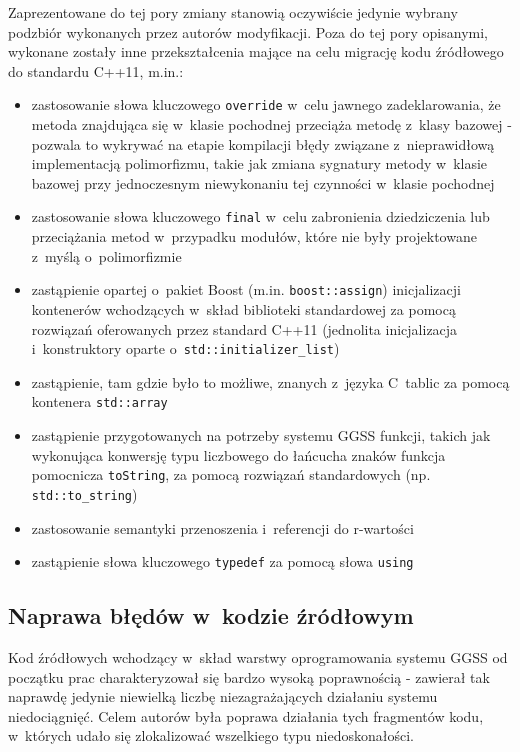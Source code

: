 Zaprezentowane do tej pory zmiany stanowią oczywiście jedynie wybrany podzbiór wykonanych przez autorów modyfikacji. Poza do tej pory opisanymi, wykonane zostały inne przekształcenia mające na celu migrację kodu źródłowego do standardu C++11, m.in.:
\begin{itemize}
    \item zastosowanie słowa kluczowego \lstinline{override} w~celu jawnego zadeklarowania, że metoda znajdująca się w~klasie pochodnej przeciąża metodę z~klasy bazowej - pozwala to wykrywać na etapie kompilacji błędy związane z~nieprawidłową implementacją polimorfizmu, takie jak zmiana sygnatury metody w~klasie bazowej przy jednoczesnym niewykonaniu tej czynności w~klasie pochodnej
    \item zastosowanie słowa kluczowego \lstinline{final} w~celu zabronienia dziedziczenia lub przeciążania metod w~przypadku modułów, które nie były projektowane z~myślą o~polimorfizmie
    \item zastąpienie opartej o~pakiet Boost (m.in. \lstinline{boost::assign}) inicjalizacji kontenerów wchodzących w~skład biblioteki standardowej za pomocą rozwiązań oferowanych przez standard C++11 (jednolita inicjalizacja i~konstruktory oparte o~\lstinline{std::initializer_list})
    \item zastąpienie, tam gdzie było to możliwe, znanych z~języka C~tablic za pomocą kontenera \lstinline{std::array}
    \item zastąpienie przygotowanych na potrzeby systemu GGSS funkcji, takich jak wykonująca konwersję typu liczbowego do łańcucha znaków funkcja pomocnicza \lstinline{toString}, za pomocą rozwiązań standardowych (np. \lstinline{std::to_string})
    \item zastosowanie semantyki przenoszenia i~referencji do r-wartości
    \item zastąpienie słowa kluczowego \lstinline{typedef} za pomocą słowa \lstinline{using}
\end{itemize}

\subsection{Naprawa błędów w~kodzie źródłowym}
Kod źródłowych wchodzący w~skład warstwy oprogramowania systemu GGSS od początku prac charakteryzował się bardzo wysoką poprawnością - zawierał tak naprawdę jedynie niewielką liczbę niezagrażających działaniu systemu niedociągnięć. Celem autorów była poprawa działania tych fragmentów kodu, w~których udało się zlokalizować wszelkiego typu niedoskonałości. 

